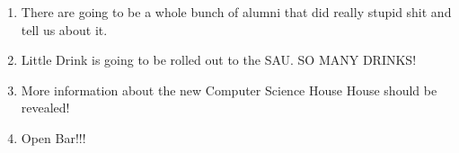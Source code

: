 \documentclass[9pt]{extarticle} %
\begin{document}
\begin{minipage}[t]{.6\linewidth}
\begin{enumerate}
\item There are going to be a whole bunch of alumni that did really stupid shit and tell us about it. 

\item Little Drink is going to be rolled out to the SAU. SO MANY DRINKS! 

\item More information about the new Computer Science House House should be revealed! 

\item Open Bar!!!

\end{enumerate}

\end{minipage} %
\end{document}
